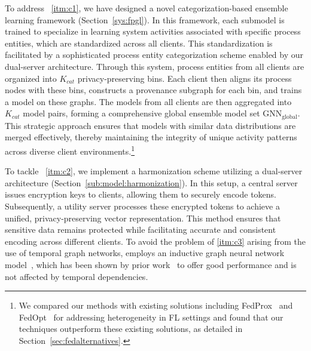 To address ~\ref{itm:c1}, we have designed a novel categorization-based \gnnshort ensemble learning framework (Section~\ref{sys:fpgl}). In this framework, each submodel is trained to specialize in learning system activities associated with specific process entities, which are standardized across all clients. This standardization is facilitated by a sophisticated process entity categorization scheme enabled by our dual-server architecture. Through this system, process entities from all clients are organized into  \( K_{cat} \) privacy-preserving bins. Each client then aligns its process nodes with these bins, constructs a provenance subgraph for each bin, and trains a \gnnshort model on these graphs. The models from all clients are then aggregated into  \( K_{cat} \) model pairs, forming a comprehensive global ensemble model set \( \text{GNN}_{\text{global}} \). This strategic approach ensures that models with similar data distributions are merged effectively, thereby maintaining the integrity of unique activity patterns across diverse client environments.\footnote{We compared our methods with existing solutions including FedProx~\cite{li2020federated} and FedOpt~\cite{asad2020fedopt} for addressing heterogeneity in FL settings and found that our techniques outperform these existing solutions, as detailed in Section~\ref{sec:fedalternatives}.}



To tackle ~\ref{itm:c2}, we implement a \wordvec harmonization scheme utilizing a dual-server architecture (Section~\ref{sub:model:harmonization}). In this setup, a central server issues encryption keys to clients, allowing them to securely encode \wordvec tokens. Subsequently, a utility server processes these encrypted tokens to achieve a unified, privacy-preserving vector representation. This method ensures that sensitive data remains protected while facilitating accurate and consistent \wordvec encoding across different clients. To avoid the problem of \ref{itm:c3} arising from the use of temporal graph networks, \Sys employs an inductive graph neural network model~\cite{hamilton2017inductive}, which has been shown by prior work~\cite{flash2024,shadewatcher,wang2022threatrace} to offer good performance and is not affected by temporal dependencies. 

